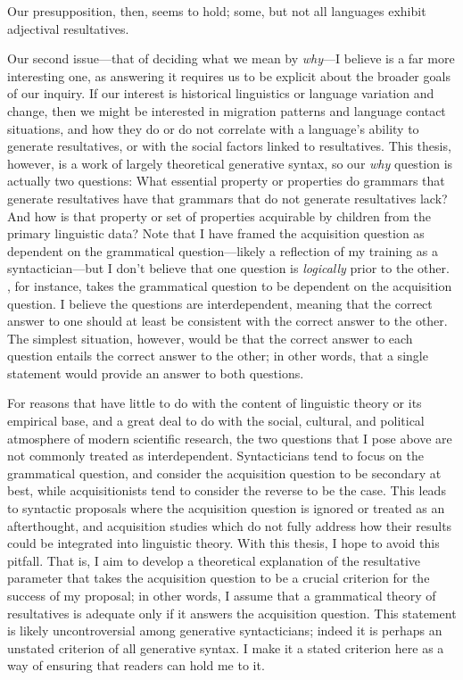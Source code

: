 \documentclass[MilwayThesis]{subfiles}
\begin{document}
Our presupposition, then, seems to hold; some, but not all languages exhibit adjectival resultatives.

Our second issue---that of deciding what we mean by \textit{why}---I believe is a far more interesting one, as answering it requires us to be explicit about the broader goals of our inquiry.
If our interest is historical linguistics or language variation and change, then we might be interested in migration patterns and language contact situations, and how they do or do not correlate with a language's ability to generate resultatives, or with the social factors linked to resultatives.
This thesis, however, is a work of largely theoretical generative syntax, so our \textit{why} question is actually two questions: What essential property or properties do grammars that generate resultatives have that grammars that do not generate resultatives lack? And how is that property or set of properties acquirable by children from the primary linguistic data?
Note that I have framed the acquisition question as dependent on the grammatical question---likely a reflection of my training as a syntactician---but I don't believe that one question is \textit{logically} prior to the other.
\textcite{snyder1995language,snyder2001nature}, for instance, takes the grammatical question to be dependent on the acquisition question.
I believe the questions are interdependent, meaning that the correct answer to one should at least be consistent with the correct answer to the other.
The simplest situation, however, would be that the correct answer to each question entails the correct answer to the other; in other words, that a single statement would provide an answer to both questions.

For reasons that have little to do with the content of linguistic theory or its empirical base, and a great deal to do with the social, cultural, and political atmosphere of modern scientific research, the two questions that I pose above are not commonly treated as interdependent.
Syntacticians tend to focus on the grammatical question, and consider the acquisition question to be secondary at best, while acquisitionists tend to consider the reverse to be the case.
This leads to syntactic proposals where the acquisition question is ignored or treated as an afterthought, and acquisition studies which do not fully address how their results could be integrated into linguistic theory.
With this thesis, I hope to avoid this pitfall.
That is, I aim to develop a theoretical explanation of the resultative parameter that takes the acquisition question to be a crucial criterion for the success of my proposal; in other words, I assume that a grammatical theory of resultatives is adequate only if it answers the acquisition question.
This statement is likely uncontroversial among generative syntacticians; indeed it is perhaps an unstated criterion of all generative syntax.
I make it a stated criterion here as a way of ensuring that readers can hold me to it.
\end{document}
